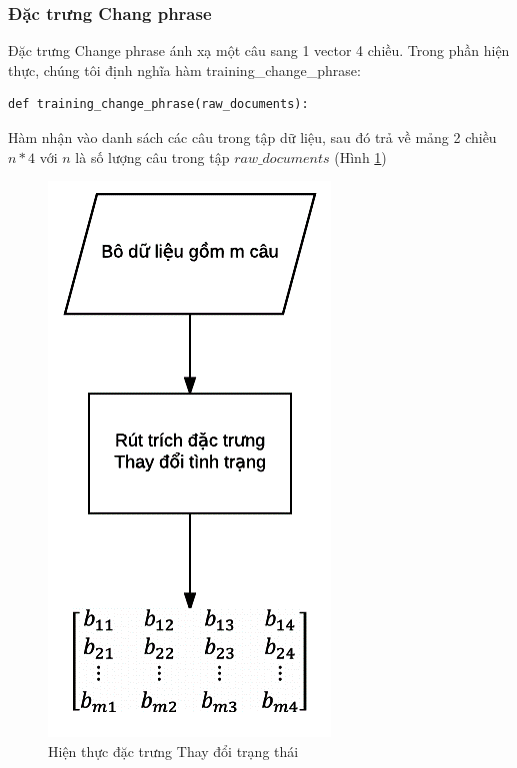 \subsubsection*{Đặc trưng Chang phrase}
Đặc trưng Change phrase ánh xạ một câu sang 1 vector 4 chiều. Trong phần hiện thực, chúng tôi định nghĩa hàm training\_change\_phrase:
\begin{lstlisting}
def training_change_phrase(raw_documents):
\end{lstlisting}
Hàm nhận vào danh sách các câu trong tập dữ liệu, sau đó trả về mảng 2 chiều $n*4$ với $n$ là số lượng câu trong tập $raw\_documents$ (Hình \ref{fig:hien-thuc-changephrase})
\begin{figure}
\centering
\includegraphics[scale=0.5]{../hinh/hien_thuc_changephrase.png}
\caption{Hiện thực đặc trưng Thay đổi trạng thái} \label{fig:hien-thuc-changephrase}
\end{figure}
